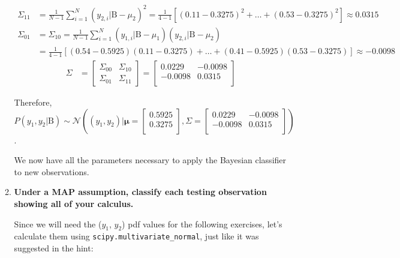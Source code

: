 \documentclass[12pt]{article}
\begin{document}
\begin{enumerate}[leftmargin=\labelsep]
\begin{enumerate}
$$\begin{aligned}
                  \Sigma_{11} & = \frac{1}{N-1} \sum^{N}_{i=1} (y_{2,i} | \text{B} - \mu_{2})^2 = \frac{1}{4-1} \left[(0.11-0.3275)^2 + \dots + (0.53-0.3275)^2\right] \approx 0.0315 \\
                  \Sigma_{01} & = \Sigma_{10} = \frac{1}{N-1} \sum^{N}_{i=1} (y_{1,i} | \text{B} - \mu_{1})(y_{2,i} | \text{B} - \mu_{2}) \\
                              & = \frac{1}{4-1} \left[(0.54-0.5925)(0.11-0.3275) + \dots + (0.41-0.5925)(0.53-0.3275)\right] \approx -0.0098
              \end{aligned}
          $$
          $$
              \begin{aligned}
                  \Sigma & = \begin{bmatrix}\Sigma_{00} & \Sigma_{10}\\ \Sigma_{01} & \Sigma_{11}\end{bmatrix} = \begin{bmatrix}0.0229 & -0.0098 \\-0.0098 & 0.0315 \\\end{bmatrix}
              \end{aligned}
          $$

          Therefore, $P(y_1, y_2|\text{B}) \sim \mathcal{N}\left((y_1, y_2) | \boldsymbol{\mu} = \begin{bmatrix}0.5925 \\0.3275 \\\end{bmatrix},
              \Sigma = \begin{bmatrix}0.0229 & -0.0098 \\-0.0098 & 0.0315 \\\end{bmatrix}\right)$.

          We now have all the parameters necessary to apply the Bayesian classifier to new observations.

          \item \textbf{Under a MAP assumption, classify each testing observation showing all of your calculus.}

          \vskip 0.3cm
          Since we will need the ($y_1$, $y_2$) pdf values for the following exercises, let's calculate them using \texttt{scipy.multivariate\_normal}, just like it was suggested in the hint:

          


\end{enumerate}
\end{enumerate}
\end{document}
